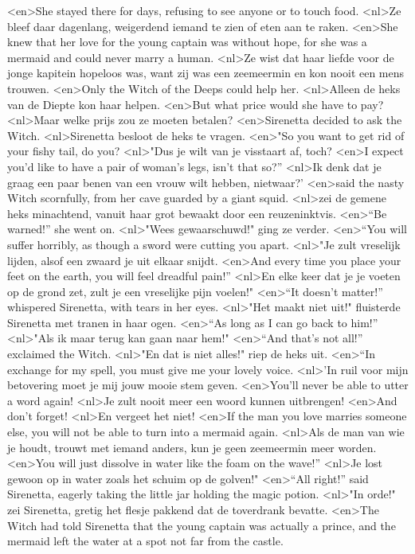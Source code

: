 <en>She stayed there for days, refusing to see anyone or to touch food.
<nl>Ze bleef daar dagenlang, weigerdend iemand te zien of eten aan te raken.
<en>She knew that her love for the young captain was without hope, for she was a mermaid and could never marry a human.
<nl>Ze wist dat haar liefde voor de jonge kapitein hopeloos was, want zij was een zeemeermin en kon nooit een mens trouwen.
<en>Only the Witch of the Deeps could help her.
<nl>Alleen de heks van de Diepte kon haar helpen.
<en>But what price would she have to pay?
<nl>Maar welke prijs zou ze moeten betalen?
<en>Sirenetta decided to ask the Witch.
<nl>Sirenetta besloot de heks te vragen.
<en>"So you want to get rid of your fishy tail, do you?
<nl>"Dus je wilt van je visstaart af, toch?
<en>I expect you’d like to have a pair of woman’s legs, isn’t that so?” 
<nl>Ik denk dat je graag een paar benen van een vrouw wilt hebben, nietwaar?'
<en>said the nasty Witch scornfully, from her cave guarded by a giant squid.
<nl>zei de gemene heks minachtend, vanuit haar grot bewaakt door een reuzeninktvis.
<en>“Be warned!” she went on.
<nl>"Wees gewaarschuwd!" ging ze verder.
<en>“You will suffer horribly, as though a sword were cutting you apart.
<nl>"Je zult vreselijk lijden, alsof een zwaard je uit elkaar snijdt.
<en>And every time you place your feet on the earth, you will feel dreadful pain!”
<nl>En elke keer dat je je voeten op de grond zet, zult je een vreselijke pijn voelen!"
<en>“It doesn’t matter!” whispered Sirenetta, with tears in her eyes.
<nl>"Het maakt niet uit!" fluisterde Sirenetta met tranen in haar ogen.
<en>“As long as I can go back to him!”
<nl>"Als ik maar terug kan gaan naar hem!"
<en>“And that’s not all!” exclaimed the Witch.
<nl>"En dat is niet alles!" riep de heks uit.
<en>“In exchange for my spell, you must give me your lovely voice.
<nl>'In ruil voor mijn betovering moet je mij jouw mooie stem geven.
<en>You’ll never be able to utter a word again!
<nl>Je zult nooit meer een woord kunnen uitbrengen!
<en>And don’t forget!
<nl>En vergeet het niet!
<en>If the man you love marries someone else, you will not be able to turn into a mermaid again.
<nl>Als de man van wie je houdt, trouwt met iemand anders, kun je geen zeemeermin meer worden.
<en>You will just dissolve in water like the foam on the wave!”
<nl>Je lost gewoon op in water zoals het schuim op de golven!"
<en>“All right!” said Sirenetta, eagerly taking the little jar holding the magic potion.
<nl>"In orde!" zei Sirenetta, gretig het flesje pakkend dat de toverdrank bevatte.
<en>The Witch had told Sirenetta that the young captain was actually a prince, and the mermaid left the water at a spot not far from the castle.
